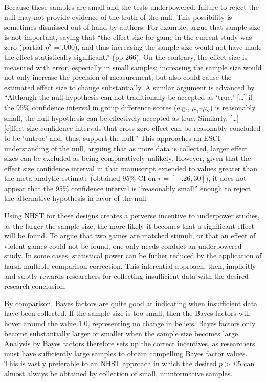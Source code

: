 \documentclass[man]{apa6}
\begin{document}
Because these samples are small and the tests underpowered, failure to reject the null may not provide evidence of the truth of the null.  This possibility is sometimes dismissed out of hand by authors. For example, \citet{Adachi:Willoughby:2011} argue that sample size is not important, saying that ``the effect size for game in the current study was zero (partial $\eta^2$ = .000), and thus increasing the sample size would not have made the effect statistically significant.'' (pp 266).  On the contrary, the effect size is measured with error, especially in small samples; increasing the sample size would not only increase the precision of measurement, but also could cause the estimated effect size to change substantially. A similar argument is advanced by \citet[p. 321]{Ferguson:etal:2008} %
``Although the null hypothesis can not traditionally be accepted as `true,' [\ldots] if the 95\% confidence interval in group difference scores (e.g., $\mu_1 – \mu_2$) is reasonably small, the null hypothesis can be effectively accepted as true. Similarly, [\ldots] [e]ffect-size confidence intervals that cross zero effect can be reasonably concluded to be ‘untrue' and, thus, support the null.'' This approaches an ESCI understanding of the null, arguing that as more data is collected, larger effect sizes can be excluded as being comparatively unlikely. However, given that the effect size confidence interval in that manuscript extended to values greater than the meta-analytic estimate (obtained 95\% CI on $r = [-.26, 30]$), it does not appear that the 95\% confidence interval is ``reasonably small'' enough to reject the alternative hypothesis in favor of the null.

Using NHST for these designs creates a perverse incentive to underpower studies, as the larger the sample size, the more likely it becomes that a significant effect will be found. To argue that two games are matched stimuli, or that an effect of violent games could not be found, one only needs conduct an underpowered study. In some cases, statistical power can be futher reduced by the application of harsh multiple comparison correction. This inferential approach, then, implicitly and subtly rewards researchers for collecting insufficient data with the desired research conclusion.

By comparison, Bayes factors are quite good at indicating when insufficient data have been collected. If the sample size is too small, then the Bayes factors will hover around the value $1.0$, representing no change in beliefs. Bayes factors only become substantially larger or smaller when the sample size becomes large.  Analysis by Bayes factors therefore sets up the correct incentives, as researchers must have sufficiently large samples to obtain compelling Bayes factor values. This is vastly preferable to an NHST approach in which the desired $p > .05$ can almost always be obtained by collection of small, uninformative samples.
\end{document}
